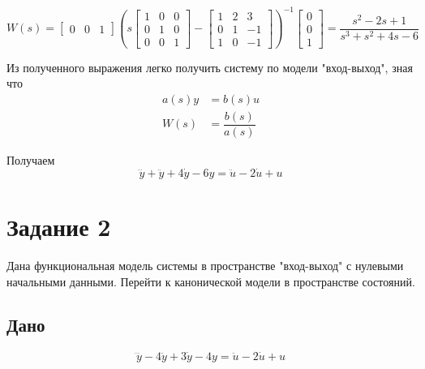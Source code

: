     \begin{equation*}
        W(s) =
        \begin{bmatrix}
            0& 0& 1
        \end{bmatrix}
        \left(
        s
        \begin{bmatrix}
            1& 0& 0\\
            0& 1& 0\\
            0& 0& 1
        \end{bmatrix}
        -
        \begin{bmatrix}
            1& 2& 3 \\
            0& 1& -1\\
            1& 0& -1
        \end{bmatrix}
        \right)^{-1}
        \begin{bmatrix}
            0\\
            0\\
            1
        \end{bmatrix}
        =\dfrac{s^2 -2s + 1}{s^3 + s^2 +4s -6}
    \end{equation*}

    Из полученного выражения легко получить систему по модели "вход-выход", зная что
    \begin{equation*}
        \begin{aligned}
            a(s)y &= b(s)u\\
            W(s) &= \dfrac{b(s)}{a(s)}
        \end{aligned}
    \end{equation*}

    Получаем
    \begin{equation*}
        \dddot{y} + \ddot{y} + 4\dot{y} - 6y = \ddot{u}-2\dot{u} +u
    \end{equation*}

    \section*{Задание 2}
    Дана функциональная модель системы в пространстве "вход-выход" с нулевыми начальными данными.
    Перейти к канонической модели в пространстве состояний.

    \subsection*{Дано}
    \begin{equation*}
        \dddot{y} - 4\ddot{y} + 3\dot{y} - 4y = \ddot{u} - 2\dot{u} + u
    \end{equation*}

